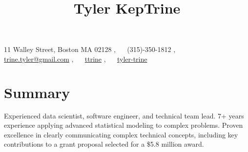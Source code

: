 \documentclass[10pt]{article}
\begin{document}
\title{Tyler KepTrine}
11 Walley Street, Boston MA 02128 \sep
{~{\faMobile}~}  (315)-350-1812 \sep
{~{\footnotesize\faEnvelopeO}~} \href{mailto:trine.tyler@gmail.com}{trine.tyler@gmail.com} \sep
{~\faGithub~} \href{https://github.com/ttrine}{ttrine} \sep
{~\small\faLinkedin~} \href{https://www.linkedin.com/in/tyler-trine/}{tyler-trine}

\section{Summary} Experienced data scientist, software engineer, and technical team lead. 7+ years experience applying advanced statistical modeling to complex problems. Proven excellence in clearly communicating complex technical concepts, including key contributions to a grant proposal selected for a \$5.8 million award.
\end{document}
